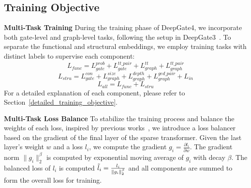 \vspace{-5pt}
\subsection{Training Objective}
\label{sec:Training_Objective}
\noindent\textbf{Multi-Task Training}  During the training phase of DeepGate4, we incorporate both gate-level and graph-level tasks, following the setup in DeepGate3~\citep{shi2024deepgate3}. To separate the functional and structural embeddings, we employ training tasks with distinct labels to supervise each component:
\begin{equation}
    L_{func} = L_{gate}^{prob} + L_{gate}^{tt\_pair} + L_{graph}^{tt} + L_{graph}^{tt\_pair} 
\end{equation}
\begin{equation}
    L_{stru} = L_{gate}^{con} + L_{graph}^{size} + L_{graph}^{depth}+ L_{graph}^{ged\_pair} + L_{in}
\end{equation}
\begin{equation}
    L_{all} = L_{func} + L_{stru}
    \label{eq:overall_loss}
\end{equation}
For a detailed explanation of each component, please refer to Section~\ref{detailed_training_objective}.

\noindent\textbf{Multi-Task Loss Balance} To stabilize the training process and balance the weights of each loss, inspired by previous works~\citep{gradnorm1,gradnorm2}, we introduce a loss balancer based on the gradient of the final layer of the sparse transformer. Given the last layer's weight $w$ and a loss $l_i$, we compute the gradient $g_i=\frac{\partial l_i}{\partial w}$. The gradient norm $\|g_i\|_2^\beta$ is computed by exponential moving average of $g_i$ with decay $\beta$. The balanced loss of $l_i$ is computed $\Tilde{l}_i = \frac{l_i}{\|g_i\|_2^\beta}$ and all components are summed to form the overall loss for training.

\vspace{-5pt}
